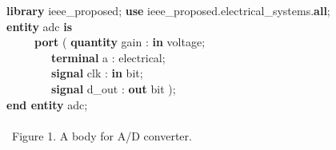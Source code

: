 {\small
\begin{tabbing}
\ \ \ \= \textbf{library} ieee\_proposed; \textbf{use} ieee\_proposed.electrical\_systems.\textbf{all}; \\ 
\ \ \ \= \textbf{entity} adc \textbf{is} \\
\> \ \ \ \ \ \ \ \ \= \textbf{port} ( \textbf{quantity} gain : \textbf{in} voltage; \\
\> \> \ \ \ \ \ \ \ \ \ \ \ \= \textbf{terminal} a : electrical; \\
\> \> \ \ \ \ \ \ \ \ \ \ \ \= \textbf{signal} clk : \textbf{in} bit; \\
\> \> \ \ \ \ \ \ \ \ \ \ \ \= \textbf{signal} d\_out : \textbf{out} bit ); \\
\ \ \ \= \textbf{end entity} adc;
\ \ \ \     \\
\ \ \ \     \\
\ \ \ \ Figure 1. A \ent body for A/D converter.
\end{tabbing}
}

